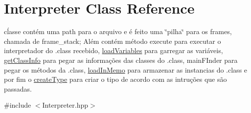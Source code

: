 \hypertarget{class_interpreter}{}\section{Interpreter Class Reference}
\label{class_interpreter}


cĺasse contém uma path para o arquivo e é feito uma \char`\"{}pilha\char`\"{} para os frames, chamada de frame\+\_\+stack; Além contém método execute para executar o interpretador do .class recebido, \hyperlink{class_interpreter_1_1load_variables}{load\+Variables} para garregar as variáveis, \hyperlink{class_interpreter_1_1get_class_info}{get\+Class\+Info} para pegar as informações das classes do .class, main\+F\+Inder para pegar os métodos da .class, \hyperlink{class_interpreter_1_1load_in_memo}{load\+In\+Memo} para armazenar as instancias do .class e por fim o \hyperlink{class_interpreter_1_1create_type}{create\+Type} para criar o tipo de acordo com as intruções que são passadas.  




{\ttfamily \#include $<$Interpreter.\+hpp$>$}

